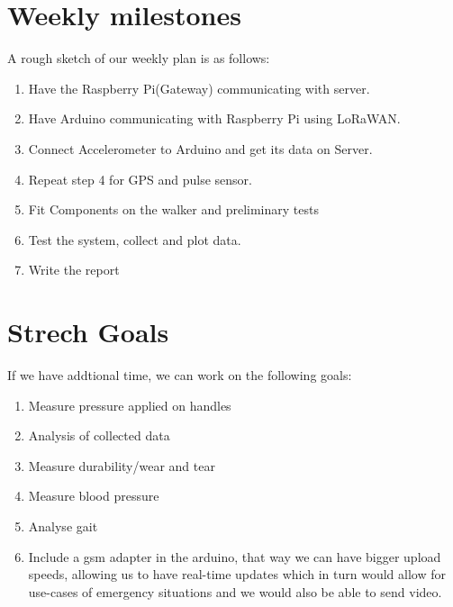 \documentclass[conference]{IEEEtran}
\begin{document}
\section{Weekly milestones}
A rough sketch of our weekly plan is as follows:

\begin{enumerate}
	\item Have the Raspberry Pi(Gateway) communicating with server.
	\item Have Arduino communicating with Raspberry Pi using LoRaWAN.
	\item Connect Accelerometer to Arduino and get its data on Server.
	\item Repeat step 4 for GPS and pulse sensor.
	\item Fit Components on the walker and preliminary tests
	\item Test the system, collect and plot data.
	\item Write the report
\end{enumerate}

\section{Strech Goals}
If we have addtional time, we can work on the following goals:
\begin{enumerate}
	\item Measure pressure applied on handles
	\item Analysis of collected data
	\item Measure durability/wear and tear
	\item Measure blood pressure
	\item Analyse gait
	\item Include a gsm adapter in the arduino, that way we can have bigger upload speeds, allowing us to have real-time updates which in turn would allow for use-cases of emergency situations and we would also be able to send video.
\end{enumerate}



\end{document}
